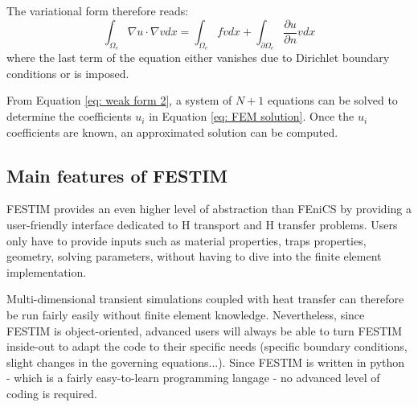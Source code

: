 The variational form therefore reads:
\begin{equation}
    \int_{\Omega_e} \nabla u \cdot \nabla v dx = \int_{\Omega_e} f v dx + \int_{\partial \Omega_e} \frac{\partial u}{\partial n} v dx
    \label{eq: weak form 2}
\end{equation}
where the last term of the equation either vanishes due to Dirichlet boundary conditions or is imposed.

From Equation \ref{eq: weak form 2}, a system of $N+1$ equations can be solved to determine the coefficients $u_i$ in Equation \ref{eq: FEM solution}.
Once the $u_i$ coefficients are known, an approximated solution can be computed.

\subsection{Main features of FESTIM}
FESTIM provides an even higher level of abstraction than FEniCS by providing a user-friendly interface dedicated to H transport and H transfer problems.
Users only have to provide inputs such as material properties, traps properties, geometry, solving parameters, without having to dive into the finite element implementation.

Multi-dimensional transient simulations coupled with heat transfer can therefore be run fairly easily without finite element knowledge.
Nevertheless, since FESTIM is object-oriented, advanced users will always be able to turn FESTIM inside-out to adapt the code to their specific needs (specific boundary conditions, slight changes in the governing equations...).
Since FESTIM is written in python - which is a fairly easy-to-learn programming langage - no advanced level of coding is required.




